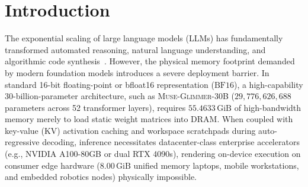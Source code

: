 \documentclass[10pt,twocolumn,letterpaper]{article}
\newcommand{\modelname}{\textsc{Muse-Glimmer-30B}}
\newcommand{\systemname}{\textsc{Project LEAN}}
\begin{document}
\begin{abstract}
Under physical runtime execution on an $8.00\,\text{GiB}$ commodity edge envelope, \systemname{} maintains a peak physical memory footprint of \textbf{$6.8652\,\text{GiB}$} across a 4,096-token context, leaving $1,162.04\,\text{MiB}$ of free operating system headroom while sustaining an in-RAM generation throughput of \textbf{$19.41\,\text{tokens/sec}$}---a $129.4\times$ speedup over SSD layer-streaming approaches. On an independent, zero-heuristic canonical benchmark battery on live NVIDIA A100 hardware evaluated at exact storage parity ($6.08\,\text{GiB}$), \systemname{} establishes state-of-the-art code generation and reasoning retention ($64.4\%$ HumanEval Pass@1 vs. GPTQ $60.4\%$, Uniform $57.6\%$, HQQ $43.2\%$, and FP16 $49.2\%$; $25.9\%$ ARC-Challenge vs. GPTQ $22.4\%$), while providing transparent characterization of single-token arithmetic sensitivity on GSM8K ($9.3\%$ vs. GPTQ $22.1\%$). All code, model weights, verification scripts, and cryptographic audit ledgers are publicly available.
\end{abstract}

\section{Introduction}
\label{sec:intro}

The exponential scaling of large language models (LLMs) has fundamentally transformed automated reasoning, natural language understanding, and algorithmic code synthesis~\cite{vaswani2017attention,touvron2023llama,qwen2024qwen25}. However, the physical memory footprint demanded by modern foundation models introduces a severe deployment barrier. In standard 16-bit floating-point or bfloat16 representation ($\text{BF16}$), a high-capability 30-billion-parameter architecture, such as \modelname{} ($29,776,626,688$ parameters across 52 transformer layers), requires $55.4633\,\text{GiB}$ of high-bandwidth memory merely to load static weight matrices into DRAM. When coupled with key-value (KV) activation caching and workspace scratchpads during auto-regressive decoding, inference necessitates datacenter-class enterprise accelerators (e.g., NVIDIA A100-80GB or dual RTX 4090s), rendering on-device execution on consumer edge hardware ($8.00\,\text{GiB}$ unified memory laptops, mobile workstations, and embedded robotics nodes) physically impossible.
\end{document}

